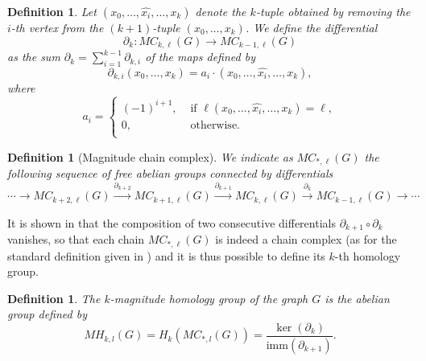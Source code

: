 \documentclass{article}
\newtheorem{definition}[theorem]{Definition}
\newcommand{\imm}{\mathrm{imm}}
\begin{document}
	\begin{definition}%
		\label{differential}
		Let $(x_0,\dots,\hat{x_i},\dots,x_k)$ denote the $k$-tuple obtained by removing the $i$-th vertex from the $(k+1)$-tuple $(x_0,\dots,x_k)$.  We define the differential 
		\[
		\partial_k: MC_{k,\ell}(G) \to MC_{k-1,\ell}(G)
		\]
		as the sum $\partial_k= \sum_{i=1}^{k-1} \partial_{k,i}$ of the maps defined by 
		\[
		\partial_{k,i}(x_0,\dots,x_k) = a_i\cdot(x_0,\dots,\hat{x_i},\dots,x_k),
		\]
		where
		\[a_i=\begin{cases}
			(-1)^{i+1}, &\text{ if } \ell(x_0,\dots,\hat{x_i},\dots,x_k) = \ell, \\
			0, &\text{ otherwise.}\\
		\end{cases}
		\]
	\end{definition}
	
	\begin{definition}[Magnitude chain complex]
		We indicate as $MC_{*,\ell}(G)$ the following sequence of free abelian groups connected by differentials
		\[
		\cdots \to MC_{k+2,\ell}(G) \xrightarrow{\partial_{k+2}} MC_{k+1,\ell}(G) \xrightarrow{\partial_{k+1}} MC_{k,\ell}(G) \xrightarrow{\partial_{k}} MC_{k-1,\ell}(G) \to \cdots
		\]
	\end{definition}
	
	It is shown in \cite[Lemma 11]{hepworth2015categorifying} that the composition of two consecutive differentials $\partial_{k+1} \circ \partial_k$ vanishes, so that each chain $MC_{*,\ell}(G)$ is indeed a chain complex (as for the standard definition given in \cite{hatcher2005algebraic}) and it is thus possible to define its $k$-th homology group.
	
	\begin{definition}
		\label{def_MH}
		The $k$-magnitude homology group of the graph $G$ is the abelian group defined by
		\[
		MH_{k,l}(G) = H_k(MC_{*,l}(G)) = \frac{\ker(\partial_k)}{\imm(\partial_{k+1})}.
		\]
	\end{definition}
	
\end{document}
